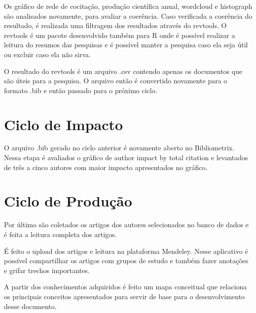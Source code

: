 Os gráfico de rede de cocitação, produção científica anual, wordcloud e histograph são analisados novamente, para avaliar a coerência. Caso verificada a coerência do resultado, é realizada uma filtragem dos resultados através do revtools. O revtools é um pacote desenvolvido também para R onde é possível realizar a leitura do resumos das pesquisas e é possível manter a pesquisa caso ela seja útil ou excluir caso ela não sirva.

O resultado do revtools é um arquivo .csv contendo apenas os documentos que são úteis para a pesquisa. O arquivo então é convertido novamente para o formato .bib e então passado para o próximo ciclo.

\section{Ciclo de Impacto}
O arquivo .bib gerado no ciclo anterior é novamente aberto no Bibliometrix. Nessa etapa é avaliados o gráfico de author impact by total citation e levantados de três a cinco autores com maior impacto apresentados no gráfico.

\section{Ciclo de Produção}
Por último são coletados os artigos dos autores selecionados no banco de dados e é feita a leitura completa dos artigos. 

É feito o upload dos artigos e leitura na plataforma Mendeley. Nesse aplicativo é possível compartilhar os artigos com grupos de estudo e também fazer anotações e grifar trechos importantes. 

A partir dos conhecimentos adquiridos é feito um mapa conceitual que relaciona os principais conceitos apresentados para servir de base para o desenvolvimento desse documento.





